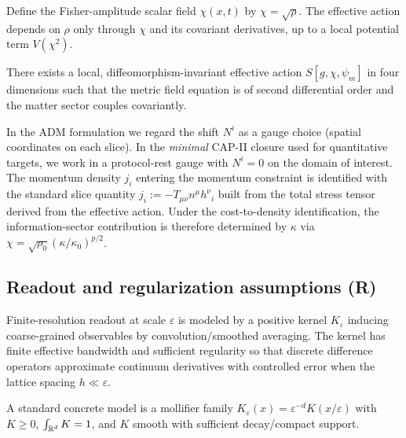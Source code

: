 \begin{assumption}
\label{ass:fisher_amplitude}
Define the Fisher-amplitude scalar field $\chi(x,t)$ by $\chi=\sqrt{\rho}$.
The effective action depends on $\rho$ only through $\chi$ and its covariant derivatives, up to a local potential term $V(\chi^2)$.
\end{assumption}

\begin{assumption}
\label{ass:covariant_action}
There exists a local, diffeomorphism-invariant effective action $S[g,\chi,\psi_m]$ in four dimensions such that the metric field equation is of second differential order and the matter sector couples covariantly.
\end{assumption}

\begin{assumption}
\label{ass:shift_closure}
In the ADM formulation we regard the shift $N^i$ as a gauge choice (spatial coordinates on each slice).
In the \emph{minimal} CAP-II closure used for quantitative targets, we work in a protocol-rest gauge with $N^i=0$ on the domain of interest.
The momentum density $j_i$ entering the momentum constraint is identified with the standard slice quantity
$j_i := -T_{\mu\nu}n^\mu h^\nu{}_i$ built from the total stress tensor derived from the effective action.
Under the cost-to-density identification, the information-sector contribution is therefore determined by $\kappa$ via $\chi=\sqrt{\rho_0}(\kappa/\kappa_0)^{p/2}$.
\end{assumption}

\subsection{Readout and regularization assumptions (R)}
\label{subsec:assumptions_readout}

\begin{assumption}
\label{ass:kernel_readout}
Finite-resolution readout at scale $\varepsilon$ is modeled by a positive kernel $K_\varepsilon$ inducing coarse-grained observables by convolution/smoothed averaging.
The kernel has finite effective bandwidth and sufficient regularity so that discrete difference operators approximate continuum derivatives with controlled error when the lattice spacing $h\ll\varepsilon$.
\par
\noindent A standard concrete model is a mollifier family $K_\varepsilon(x)=\varepsilon^{-d}K(x/\varepsilon)$ with $K\ge 0$, $\int_{\mathbb{R}^d}K=1$, and $K$ smooth with sufficient decay/compact support.
\end{assumption}

